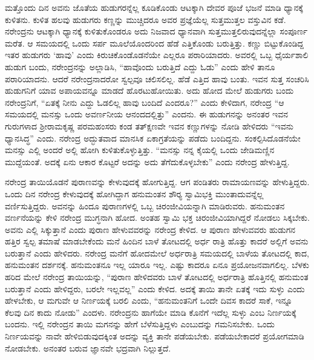 ಮತ್ತೊಂದು ದಿನ ಅವನು ಜೊತೆಯ ಹುಡುಗರನ್ನೆಲ್ಲ ಕೂಡಿಕೊಂಡು ಆಟಕ್ಕಾಗಿ ದೇವರ ಪೂಜೆ ಭಜನೆ ಮಾಡಿ ಧ್ಯಾನಕ್ಕೆ ಕುಳಿತನು. ಕುಳಿತ ಹಲವು ಹುಡುಗರು ಕಣ್ಣನ್ನು ಮುಚ್ಚಿದರೂ ಅವರ ಪ್ರಜ್ಞೆಯೆಲ್ಲ ಸುತ್ತಮುತ್ತಲ ವಸ್ತುವಿನ ಕಡೆ. ನರೇಂದ್ರನು ಆಟಕ್ಕಾಗಿ ಧ್ಯಾನಕ್ಕೆ ಕುಳಿತುಕೊಂಡರೂ ಅದು ನಿಜವಾದ ಧ್ಯಾನವಾಗಿ ಸುತ್ತಮುತ್ತಲಿರುವುದನ್ನೆಲ್ಲಾ ಸಂಪೂರ್ಣ ಮರೆತ. ಆ ಸಮಯದಲ್ಲಿ ಒಂದು ಸರ್ಪ ಮೂಲೆಯೊಂದರಿಂದ ಹೆಡೆ ಎತ್ತಿಕೊಂಡು ಬರುತ್ತಿತ್ತು. ಕಣ್ಣು ಬಿಟ್ಟುಕೊಂಡಿದ್ದ ಇತರ ಹುಡುಗರು ‘ಹಾವು’ ಎಂದು ಕಿರುಚಿಕೊಂಡೊಡನೆಯೇ ಎಲ್ಲರೂ ಪರಾರಿಯಾದರು. ಅವರಲ್ಲಿ ಒಬ್ಬ ಧೈರ್ಯಶಾಲಿ ಹುಡುಗ ಬಂದು, ನರೇಂದ್ರನನ್ನು ಅಲ್ಲಾಡಿಸಿ, “ಹಾವೊಂದು ಬರುತ್ತಿದೆ ಎದ್ದು ಓಡು” ಎಂದು ಹೇಳಿ ತಾನೂ ಪರಾರಿಯಾದನು. ಆದರೆ ನರೇಂದ್ರನಾದರೋ ಸ್ವಲ್ಪವೂ ಚಲಿಸಲಿಲ್ಲ. ಹೆಡೆ ಎತ್ತಿದ ಹಾವು ಬಂತು. ಇವನ ಸುತ್ತ ಸಂಚರಿಸಿ ಹುಡುಗನಿಗೆ ಯಾವ ಅಪಾಯವನ್ನೂ ಮಾಡದೆ ಹೊರಟುಹೋಯಿತು. ಅದು ಹೋದ ಮೇಲೆ ಹುಡುಗರು ಬಂದು ನರೇಂದ್ರನಿಗೆ, “ಏತಕ್ಕೆ ನೀನು ಎದ್ದು ಓಡಲಿಲ್ಲ ಹಾವು ಬಂದಿದೆ ಎಂದರೂ?” ಎಂದು ಕೇಳಿದಾಗ, ನರೇಂದ್ರ “ಆ ಸಮಯದಲ್ಲಿ ಮನಸ್ಸು ಒಂದು ಅವರ್ಣನೀಯ ಆನಂದದಲ್ಲಿತ್ತು” ಎಂದನು. ಈ ಹುಡುಗನನ್ನು ಅನಂತರ ಇವನ ಗುರುಗಳಾದ ಶ‍್ರೀರಾಮಕೃಷ್ಣ ಪರಮಹಂಸರು ಕಂಡ ತತ್‍ಕ್ಷಣವೇ ಇವನ ಕಣ್ಣುಗಳನ್ನು ನೋಡಿ ಹೇಳಿದರು “ಇವನು ಧ್ಯಾನಸಿದ್ಧ” ಎಂದು. ನರೇಂದ್ರ ಅದ್ಭುತವಾದ ಮಾನಸಿಕ ಏಕಾಗ್ರತೆಯನ್ನು ಪಡೆದು ಬಂದಿದ್ದನು. ಸಂಕಲ್ಪಿಸಿದೊಡನೆಯೇ ಮನಸ್ಸು ಎಲ್ಲಿ ಅಂದರೆ ಅಲ್ಲಿ ಹೋಗಿ ಕುಳಿತುಕೊಳ್ಳುತ್ತಿತ್ತು. “ಮನಸ್ಸು ನನ್ನ ಕೈಯಲ್ಲಿ ಒಂದು ಜೇಡಿಮಣ್ಣಿನ ಮುದ್ದೆಯಂತೆ. ಅದಕ್ಕೆ ಏನು ಆಕಾರ ಕೊಟ್ಟರೆ ಅದನ್ನು ಅದು ತೆಗೆದುಕೊಳ್ಳಬೇಕು” ಎಂದು ನರೇಂದ್ರ ಹೇಳುತ್ತಿದ್ದ.

ನರೇಂದ್ರ ತಾಯಿಯೊಡನೆ ಪುರಾಣವನ್ನು ಕೇಳುವುದಕ್ಕೆ ಹೋಗುತ್ತಿದ್ದ. ಆಗ ಪಂಡಿತರು ರಾಮಾಯಣವನ್ನು ಹೇಳುತ್ತಿದ್ದರು. ಒಂದು ದಿನ ನರೇಂದ್ರ ಕೇಳುವುದಕ್ಕೆ ಹೋಗಿದ್ದಾಗ ಹನುಮಂತನ ಶೌರ‍್ಯ ಸ್ವಾಮಿಭಕ್ತಿ ಮುಂತಾದುವನ್ನೆಲ್ಲ ವರ್ಣಿಸುತ್ತಿದ್ದರು. ಅವನನ್ನು ಹಿಂದೂ ಪುರಾಣಗಳಲ್ಲಿ ಒಬ್ಬ ಚಿರಂಜೀವಿಯನ್ನಾಗಿ ಮಾಡಿರುವರು. ಹನುಮಂತನ ವರ್ಣನೆಯನ್ನು ಕೇಳಿ ನರೇಂದ್ರ ಮುಗ್ಧನಾಗಿ ಹೋದ. ಅಂತಹ ಸ್ವಾಮಿ ಭಕ್ತ ಚಿರಂಜೀವಿಯಾಗಿದ್ದರೆ ನೋಡಲು ಸಿಕ್ಕಬೇಕು. ಅವನು ಎಲ್ಲಿ ಸಿಕ್ಕುತ್ತಾನೆ ಎಂದು ಪುರಾಣ ಹೇಳುವವರನ್ನು ನರೇಂದ್ರ ಕೇಳಿದ. ಆ ಪುರಾಣ ಹೇಳುವವರು ಹುಡುಗನ ಹತ್ತಿರ ಸ್ವಲ್ಪ ತಮಾಷೆ ಮಾಡಬೇಕೆಂದು ಮನೆ ಹಿಂದಿನ ಬಾಳೆ ತೋಟದಲ್ಲಿ ಅರ್ಧ ರಾತ್ರಿ ಹೊತ್ತು ಕಾದರೆ ಅಲ್ಲಿಗೆ ಅವನು ಬರುತ್ತಾನೆ ಎಂದು ಹೇಳಿದರು. ನರೇಂದ್ರ ಮನೆಗೆ ಹೋದಮೇಲೆ ಅರ್ಧರಾತ್ರಿ ಸಮಯದಲ್ಲಿ ಬಾಳೆಯ ತೋಟದಲ್ಲಿ ಕಾದ, ಹನುಮಂತನ ದರ್ಶನಕ್ಕೆ. ಹನುಮಂತನೂ ಇಲ್ಲ ಯಾರೂ ಇಲ್ಲ. ಎಷ್ಟು ಕಾದರೂ ಏನೂ ಪ್ರಯೋಜನವಾಗಲಿಲ್ಲ. ಬೆಳಕು ಹರಿದ ಮೇಲೆ ನರೇಂದ್ರ ತಾಯಿಯನ್ನು, “ಪುರಾಣ ಹೇಳಿದವರು ಬಾಳೆ ತೋಟದಲ್ಲಿ ಅರ್ಧರಾತ್ರಿ ಹೊತ್ತಿನಲ್ಲಿ ಹನುಮಂತ ಬರುತ್ತಾನೆ ಎಂದು ಹೇಳಿದ್ದರು, ಬರಲೇ ಇಲ್ಲವಲ್ಲ” ಎಂದು ಕೇಳಿದ. ಅದಕ್ಕೆ ತಾಯಿ ತಾನೇ ಏತಕ್ಕೆ ಇದು ಸುಳ್ಳು ಎಂದು ಹೇಳಬೇಕು, ಆ ಮಗುವೇ ಆ ನಿರ್ಣಯಕ್ಕೆ ಬರಲಿ ಎಂದು, “ಹನುಮಂತನಿಗೆ ಒಂದೇ ದಿವಸ ಕಾದರೆ ಸಾಕೆ, ಇನ್ನೂ ಕೆಲವು ದಿನ ಕಾದು ನೋಡು” ಎಂದಳು. ನರೇಂದ್ರನು ಹಾಗೆಯೇ ಮಾಡಿ ಕೊನೆಗೆ ಇದೆಲ್ಲ ಸುಳ್ಳು ಎಂಬ ನಿರ್ಣಯಕ್ಕೆ ಬಂದನು. ಇಲ್ಲಿ ನರೇಂದ್ರನ ತಾಯಿ ಮಗನನ್ನು ಹೇಗೆ ಬೆಳೆಸುತ್ತಿದ್ದಳು ಎಂಬುದನ್ನು ಗಮನಿಸಬೇಕು. ಒಂದು ನಿರ್ಣಯವನ್ನು ನಾವೇ ಹೇಳಿಬಿಡುವುದಕ್ಕಿಂತ ಅದನ್ನು ವ್ಯಕ್ತಿ ತಾನೇ ಪಡೆಯಬೇಕು. ಪಡೆಯಬೇಕಾದರೆ ಪ್ರಯೋಗಮಾಡಿ ನೋಡಬೇಕು. ಅನಂತರ ಬರುವ ಜ್ಞಾನವೇ ಭದ್ರವಾಗಿ ನಿಲ್ಲುತ್ತದೆ.

